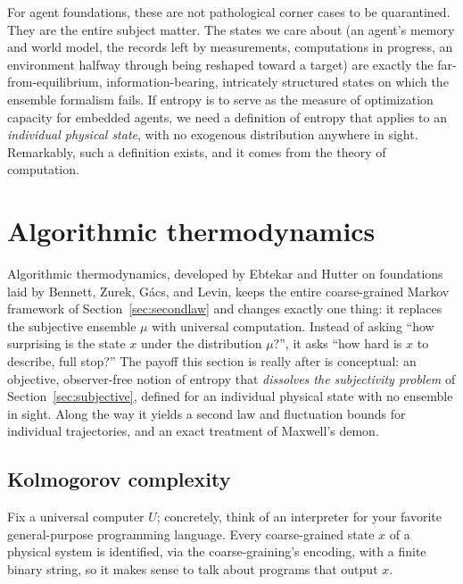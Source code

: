 \documentclass[10pt]{article}
\theoremstyle{definition}
\theoremstyle{remark}
\begin{document}
For agent foundations, these are not pathological corner cases to be quarantined. They are the entire subject matter. The states we care about (an agent's memory and world model, the records left by measurements, computations in progress, an environment halfway through being reshaped toward a target) are exactly the far-from-equilibrium, information-bearing, intricately structured states on which the ensemble formalism fails. If entropy is to serve as the measure of optimization capacity for embedded agents, we need a definition of entropy that applies to an \emph{individual physical state}, with no exogenous distribution anywhere in sight. Remarkably, such a definition exists, and it comes from the theory of computation.

\section{Algorithmic thermodynamics}
\label{sec:algo}

Algorithmic thermodynamics, developed by Ebtekar and Hutter on foundations laid by Bennett, Zurek, G\'acs, and Levin, keeps the entire coarse-grained Markov framework of Section~\ref{sec:secondlaw} and changes exactly one thing: it replaces the subjective ensemble $\mu$ with universal computation. Instead of asking ``how surprising is the state $x$ under the distribution $\mu$?'', it asks ``how hard is $x$ to describe, full stop?'' The payoff this section is really after is conceptual: an objective, observer-free notion of entropy that \emph{dissolves the subjectivity problem} of Section~\ref{sec:subjective}, defined for an individual physical state with no ensemble in sight. Along the way it yields a second law and fluctuation bounds for individual trajectories, and an exact treatment of Maxwell's demon.

\subsection{Kolmogorov complexity}
\label{sec:kolmogorov}

Fix a universal computer $U$; concretely, think of an interpreter for your favorite general-purpose programming language. Every coarse-grained state $x$ of a physical system is identified, via the coarse-graining's encoding, with a finite binary string, so it makes sense to talk about programs that output $x$.
\end{document}
